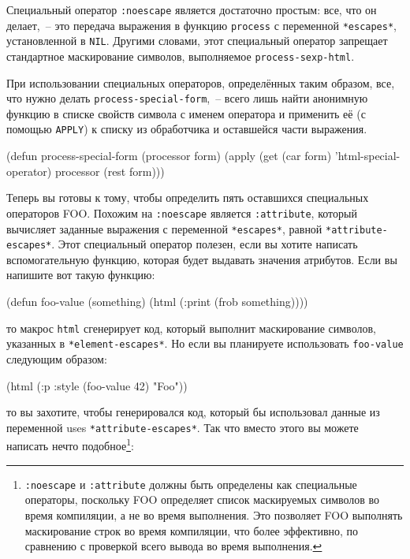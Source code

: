Специальный оператор \lstinline{:noescape} является достаточно простым: все, что он делает,~--
это передача выражения в функцию \lstinline{process} с переменной \lstinline{*escapes*},
установленной в \lstinline{NIL}.  Другими словами, этот специальный оператор запрещает
стандартное маскирование символов, выполняемое \lstinline{process-sexp-html}.

При использовании специальных операторов, определённых таким образом, все, что нужно делать
\lstinline{process-special-form},~-- всего лишь найти анонимную функцию в списке свойств символа
с именем оператора и применить её (с помощью \lstinline{APPLY}) к списку из обработчика и
оставшейся части выражения.

\begin{myverb}
(defun process-special-form (processor form)
  (apply (get (car form) 'html-special-operator) processor (rest form)))
\end{myverb}

Теперь вы готовы к тому, чтобы определить пять оставшихся специальных операторов FOO.
Похожим на \lstinline{:noescape} является \lstinline{:attribute}, который вычисляет заданные
выражения с переменной \lstinline{*escapes*}, равной \lstinline{*attribute-escapes*}.  Этот
специальный оператор полезен, если вы хотите написать вспомогательную функцию, которая
будет выдавать значения атрибутов.  Если вы напишите вот такую функцию:

\begin{myverb}
(defun foo-value (something)
  (html (:print (frob something))))
\end{myverb}

\noindent{}то макрос \lstinline{html} сгенерирует код, который выполнит маскирование символов, указанных в
\lstinline{*element-escapes*}.  Но если вы планируете использовать \lstinline{foo-value} следующим
образом:

\begin{myverb}
(html (:p :style (foo-value 42) "Foo"))
\end{myverb}

\noindent{}то вы захотите, чтобы генерировался код, который бы использовал данные из переменной uses
\lstinline{*attribute-escapes*}.  Так что вместо этого вы можете написать нечто
подобное\footnote{\lstinline{:noescape} и \lstinline{:attribute} должны быть определены как
  специальные операторы, поскольку FOO определяет список маскируемых символов во время
  компиляции, а не во время выполнения.  Это позволяет FOO выполнять маскирование строк во
  время компиляции, что более эффективно, по сравнению с проверкой всего вывода во время
  выполнения.}:

